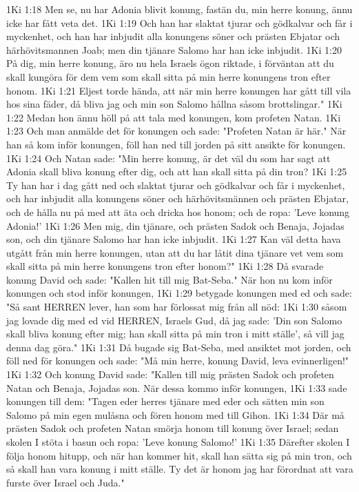 1Ki 1:18  Men se, nu har Adonia blivit konung, fastän du, min herre konung, ännu icke har fått veta det.
1Ki 1:19  Och han har slaktat tjurar och gödkalvar och får i myckenhet, och han har inbjudit alla konungens söner och prästen Ebjatar och härhövitsmannen Joab; men din tjänare Salomo har han icke inbjudit.
1Ki 1:20  På dig, min herre konung, äro nu hela Israels ögon riktade, i förväntan att du skall kungöra för dem vem som skall sitta på min herre konungens tron efter honom.
1Ki 1:21  Eljest torde hända, att när min herre konungen har gått till vila hos sina fäder, då bliva jag och min son Salomo hållna såsom brottslingar."
1Ki 1:22  Medan hon ännu höll på att tala med konungen, kom profeten Natan.
1Ki 1:23  Och man anmälde det för konungen och sade: "Profeten Natan är här." När han så kom inför konungen, föll han ned till jorden på sitt ansikte för konungen.
1Ki 1:24  Och Natan sade: "Min herre konung, är det väl du som har sagt att Adonia skall bliva konung efter dig, och att han skall sitta på din tron?
1Ki 1:25  Ty han har i dag gått ned och slaktat tjurar och gödkalvar och får i myckenhet, och har inbjudit alla konungens söner och härhövitsmännen och prästen Ebjatar, och de hålla nu på med att äta och dricka hos honom; och de ropa: 'Leve konung Adonia!'
1Ki 1:26  Men mig, din tjänare, och prästen Sadok och Benaja, Jojadas son, och din tjänare Salomo har han icke inbjudit.
1Ki 1:27  Kan väl detta hava utgått från min herre konungen, utan att du har låtit dina tjänare vet vem som skall sitta på min herre konungens tron efter honom?"
1Ki 1:28  Då svarade konung David och sade: "Kallen hit till mig Bat-Seba." När hon nu kom inför konungen och stod inför konungen,
1Ki 1:29  betygade konungen med ed och sade: "Så sant HERREN lever, han som har förlossat mig från all nöd:
1Ki 1:30  såsom jag lovade dig med ed vid HERREN, Israels Gud, då jag sade: 'Din son Salomo skall bliva konung efter mig; han skall sitta på min tron i mitt ställe', så vill jag denna dag göra."
1Ki 1:31  Då bugade sig Bat-Seba, med ansiktet mot jorden, och föll ned för konungen och sade: "Må min herre, konung David, leva evinnerligen!"
1Ki 1:32  Och konung David sade: "Kallen till mig prästen Sadok och profeten Natan och Benaja, Jojadas son. När dessa kommo inför konungen,
1Ki 1:33  sade konungen till dem: "Tagen eder herres tjänare med eder och sätten min son Salomo på min egen mulåsna och fören honom med till Gihon.
1Ki 1:34  Där må prästen Sadok och profeten Natan smörja honom till konung över Israel; sedan skolen I stöta i basun och ropa: 'Leve konung Salomo!'
1Ki 1:35  Därefter skolen I följa honom hitupp, och när han kommer hit, skall han sätta sig på min tron, och så skall han vara konung i mitt ställe. Ty det är honom jag har förordnat att vara furste över Israel och Juda."
